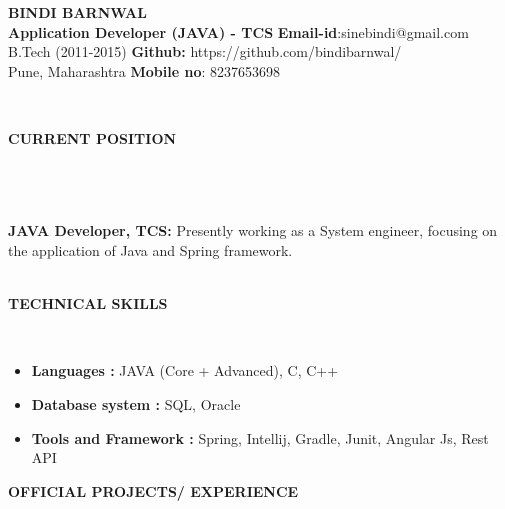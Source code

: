 \documentclass[a4paper,10pt]{article}
\newcommand{\lsep}{-0.5cm}
\newcommand{\resheading}[1]{{\small \colorbox{mygrey}{\begin{minipage}{0.975\textwidth}{\textbf{#1 \vphantom{p\^{E}}}}\end{minipage}}}}
\begin{document}
\begin{center}
\textbf{\Huge BINDI BARNWAL \\ }  
\indent \hfill \break
\indent \textbf{Application Developer (JAVA) - TCS} \hfill \textbf{Email-id}:{sinebindi@gmail.com} \\
\indent B.Tech (2011-2015)  \hfill \textbf{Github:} {https://github.com/bindibarnwal/} \\
\indent Pune, Maharashtra \hfill \textbf{Mobile no}: {8237653698} \\
\end{center}

\hspace{0.3cm}\\[-0.1cm]
\resheading{\textbf{CURRENT POSITION} }\\[\lsep] \\ \\
\textbf{JAVA Developer, TCS: } Presently working as a System engineer, focusing on the application of Java and Spring framework. \\
\hspace{0.5cm}\\[-0.2cm]
\resheading{\textbf{TECHNICAL SKILLS} }\\[\lsep]
\begin{itemize}
\item \textbf{Languages :} JAVA (Core + Advanced), C, C++  
\item \textbf{Database system :} SQL, Oracle 
\item \textbf{Tools and Framework :} Spring, Intellij, Gradle, Junit, Angular Js, Rest API 
\end{itemize}
\resheading{\textbf{OFFICIAL PROJECTS/ EXPERIENCE} }\\[\lsep]
\end{document}
